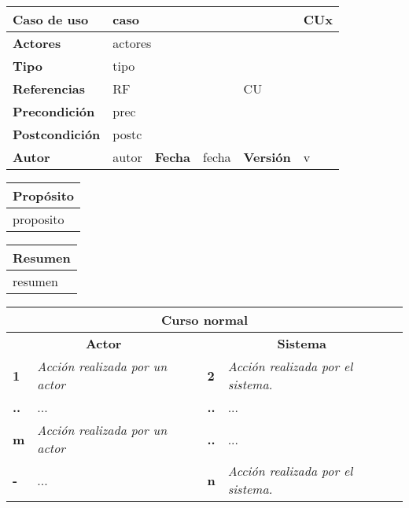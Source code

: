 \usepackage[table]{xcolor}

\begin{table}[H]
\centering
\begin{tabular}{|m{3cm}|m{4cm}|m{2cm}|m{2cm}|m{2cm}|m{1cm}|}
\hline
\textbf{Caso de uso} &  \multicolumn{4}{m{11cm}|}{caso} \vline &  \cellcolor{gray!40}CUx \\
\hline
\textbf{Actores} & \multicolumn{5}{m{11cm}|}{actores} \\
\hline
\textbf{Tipo} & \multicolumn{5}{m{11cm}|}{tipo} \\
\hline
\textbf{Referencias} &\multicolumn{3}{m{11cm}|}{RF} & \multicolumn{2}{m{4cm}|}{CU} \\
\hline
\textbf{Precondición} & \multicolumn{5}{m{11cm}|}{prec} \\
\hline
\textbf{Postcondición} & \multicolumn{5}{m{11cm}|}{postc} \\
\hline
\textbf{Autor} & autor & \textbf{Fecha} & fecha & \textbf{Versión} & v \\
\hline
\end{tabular}

\vspace{1cm}

\begin{tabular}{|m{16.2cm}|}
\hline
\textbf{Propósito} \\
\hline
proposito \\
\hline
\end{tabular}

\vspace{1cm}

\begin{tabular}{|m{16.2cm}|}
\hline
\textbf{Resumen} \\
\hline
resumen \\
\hline
\end{tabular}

\vspace{1cm}

\begin{tabular}{|m{5pt}|m{7.33cm}|m{5pt}|m{7.33cm}|}
\hline
\multicolumn{4}{|c|}{\textbf{Curso normal}} \\
\hline
\multicolumn{2}{|c}{\textbf{Actor}} & \multicolumn{2}{|c|}{\textbf{Sistema}} \\
\hline
\textbf{1} & \textit{Acción realizada por un actor} & \textbf{2} & \textit{Acción realizada por el sistema.} \\
\hline
\textbf{..} & ... & \textbf{..} & ... \\
\hline
\textbf{\footnotesize{m}} & \textit{Acción realizada por un actor} & \textbf{..} & ... \\
\hline
\textbf{-} & ... & \textbf{n} & \textit{Acción realizada por el sistema.} \\
\hline


\end{tabular}
\end{table}
